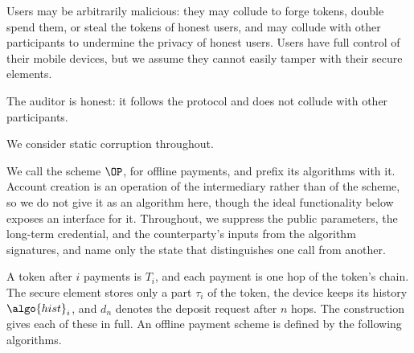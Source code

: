 Users may be arbitrarily malicious: they may collude to forge tokens, double
spend them, or steal the tokens of honest users, and may collude with other
participants to undermine the privacy of honest users. Users have full control
of their mobile devices, but we assume they cannot easily tamper with their
secure elements.

The auditor is honest: it follows the protocol and does not collude with other
participants.

We consider static corruption throughout.

We call the
scheme $\OP$, for offline payments, and prefix its algorithms with it. Account
creation is an operation of the intermediary rather than of the scheme, so we do
not give it as an algorithm here, though the ideal functionality below exposes
an interface for it. Throughout, we suppress the public parameters, the long-term credential, and the counterparty's inputs from the algorithm signatures,
and name only the state that distinguishes one call from another.

A token after $i$ payments is $T_i$, and each payment is one hop of the token's
chain. The secure element stores only a part $\tau_i$ of the token, the device
keeps its history $\algo{hist}_i$, and $d_n$ denotes the deposit request after
$n$ hops. The construction gives each of these in full. An offline payment scheme is
defined by the following algorithms.

